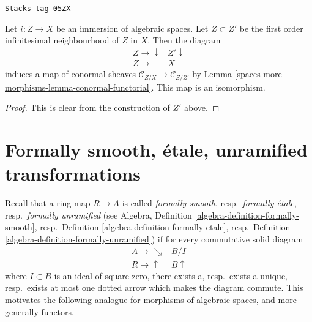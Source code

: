 \begin{lemma}
\label{spaces-more-morphisms-lemma-infinitesimal-neighbourhood-conormal}
\href{https://stacks.math.columbia.edu/tag/05ZX}{\texttt{Stacks tag 05ZX}}

Let $i : Z \to X$ be an immersion of algebraic spaces.
Let $Z \subset Z'$ be the first order infinitesimal neighbourhood
of $Z$ in $X$. Then the diagram
$$
\begin{array}{cc}Z \longrightarrow\downarrow & Z' \downarrow \\ Z \longrightarrow & X\end{array}
$$
induces a map of conormal sheaves
$\mathcal{C}_{Z/X} \to \mathcal{C}_{Z/Z'}$ by
Lemma \ref{spaces-more-morphisms-lemma-conormal-functorial}.
This map is an isomorphism.
\end{lemma}

\begin{proof}
This is clear from the construction of $Z'$ above.
\end{proof}

\section{Formally smooth, \'etale, unramified transformations}
\label{spaces-more-morphisms-section-formally-smooth-etale-unramified}
Recall that a ring map $R \to A$ is called
{\it formally smooth}, resp.\ {\it formally \'etale},
resp.\ {\it formally unramified}
(see Algebra, Definition \ref{algebra-definition-formally-smooth},
resp.\ Definition \ref{algebra-definition-formally-etale},
resp.\ Definition \ref{algebra-definition-formally-unramified})
if for every commutative solid diagram
$$
\begin{array}{cc}A \longrightarrow\searrow & B/I \\ R \longrightarrow\uparrow & B \uparrow\end{array}
$$
where $I \subset B$ is an ideal of square zero, there
exists a, resp.\ exists a unique, resp.\ exists at most one dotted
arrow which makes the diagram commute. This motivates
the following analogue for morphisms of algebraic spaces, and more
generally functors.

